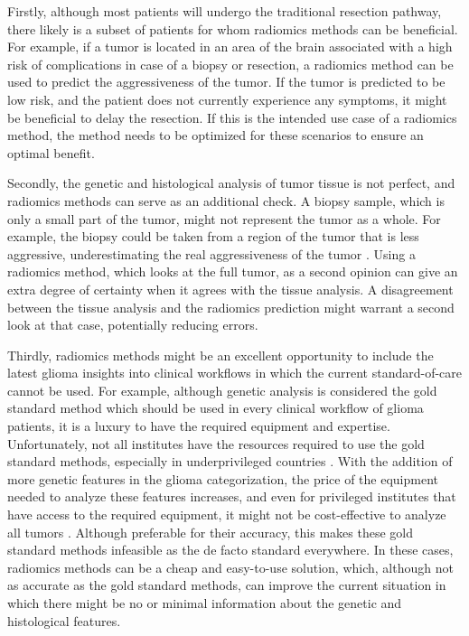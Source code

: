 Firstly, although most patients will undergo the traditional resection pathway, there likely is a subset of patients for whom radiomics methods can be beneficial.
For example, if a \gls{tumor} is located in an area of the brain associated with a high risk of complications in case of a biopsy or resection, a radiomics method can be used to predict the aggressiveness of the \gls{tumor}.
If the \gls{tumor} is predicted to be low risk, and the patient does not currently experience any symptoms, it might be beneficial to delay the resection.
If this is the intended use case of a radiomics method, the method needs to be optimized for these scenarios to ensure an optimal benefit.

Secondly, the genetic and histological analysis of \gls{tumor} tissue is not perfect, and radiomics methods can serve as an additional check.
A biopsy sample, which is only a small part of the \gls{tumor}, might not represent the \gls{tumor} as a whole.
For example, the biopsy could be taken from a region of the \gls{tumor} that is less aggressive, underestimating the real aggressiveness of the \gls{tumor} \autocite{muragaki2008biopsy}.
Using a radiomics method, which looks at the full \gls{tumor}, as a second opinion can give an extra degree of certainty when it agrees with the tissue analysis.
A disagreement between the tissue analysis and the radiomics prediction might warrant a second look at that case, potentially reducing errors.

Thirdly, radiomics methods might be an excellent opportunity to include the latest glioma insights into clinical workflows in which the current standard-of-care cannot be used.
For example, although genetic analysis is considered the gold standard method which should be used in every clinical workflow of glioma patients, it is a luxury to have the required equipment and expertise.
Unfortunately, not all institutes have the resources required to use the gold standard methods, especially in underprivileged countries \autocite{santosh2019india}.
With the addition of more genetic features in the glioma categorization, the price of the equipment needed to analyze these features increases, and even for privileged institutes that have access to the required equipment, it might not be cost-effective to analyze all \glspl{tumor} \autocite{malzkorn2016practical,dewitt2017costIDH}.
Although preferable for their accuracy, this makes these gold standard methods infeasible as the de facto standard everywhere.
In these cases, radiomics methods can be a cheap and easy-to-use solution, which, although not as accurate as the gold standard methods, can improve the current situation in which there might be no or minimal information about the genetic and histological features.

